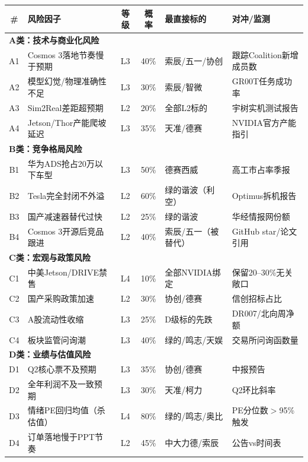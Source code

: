 \begin{table}[H]
\centering\scriptsize
\renewcommand{\arraystretch}{1.1}
\begin{tabularx}{\textwidth}{c l c c X X}
\toprule
\textbf{\#} & \textbf{风险因子} & \textbf{等级} & \textbf{概率} & \textbf{最直接标的} & \textbf{对冲/监测} \\
\midrule
\multicolumn{6}{l}{\textbf{A类：技术与商业化风险}} \\
A1 & Cosmos 3落地节奏慢于预期 & L3 & 40\% & 索辰/五一/协创 & 跟踪Coalition新增成员数 \\
A2 & 模型幻觉/物理准确性不足 & L3 & 30\% & 索辰/智微 & GR00T任务成功率 \\
A3 & Sim2Real差距超预期 & L2 & 20\% & 全部L2标的 & 宇树实机测试报告 \\
A4 & Jetson/Thor产能爬坡延迟 & L3 & 35\% & 天准/德赛 & NVIDIA官方产能指引 \\
\midrule
\multicolumn{6}{l}{\textbf{B类：竞争格局风险}} \\
B1 & 华为ADS抢占20万以下车型 & L3 & 50\% & 德赛西威 & 高工市占率季报 \\
B2 & Tesla完全封闭不外溢 & L2 & 60\% & 绿的谐波（利空） & Optimus拆机报告 \\
B3 & 国产减速器替代过快 & L2 & 25\% & 绿的谐波 & 华经情报网份额 \\
B4 & Cosmos 3开源后竞品跟进 & L2 & 40\% & 索辰/五一（被替代） & GitHub star/论文引用 \\
\midrule
\multicolumn{6}{l}{\textbf{C类：宏观与政策风险}} \\
C1 & 中美Jetson/DRIVE禁售 & \textcolor{riskred}{L4} & 10\% & 全部NVIDIA绑定 & 保留20--30\%无关敞口 \\
C2 & 国产采购政策加速 & L2 & 30\% & 协创/德赛 & 信创招标占比 \\
C3 & A股流动性收缩 & L3 & 25\% & D级标的先跌 & DR007/北向周净额 \\
C4 & 板块监管问询潮 & L3 & 40\% & 绿的/鸣志/天娱 & 交易所问询函数量 \\
\midrule
\multicolumn{6}{l}{\textbf{D类：业绩与估值风险}} \\
D1 & Q2核心票不及预期 & L3 & 35\% & 协创/德赛 & 中报预告 \\
D2 & 全年利润不及一致预期 & L3 & 30\% & 天准/柯力 & Q2环比斜率 \\
D3 & 情绪PE回归均值（杀估值） & \textcolor{riskred}{L4} & 80\% & 绿的/鸣志/奥比 & PE分位数$>$95\%触发 \\
D4 & 订单落地慢于PPT节奏 & L2 & 45\% & 中大力德/索辰 & 公告vs时间表 \\

\end{tabularx}
\end{table}
